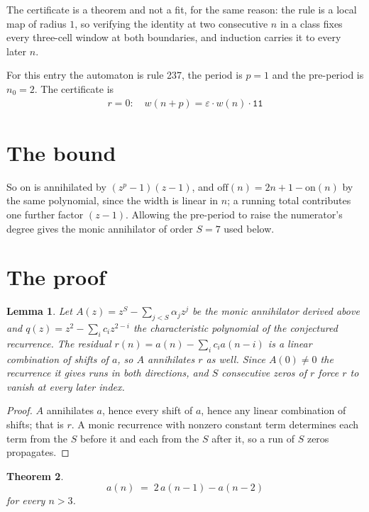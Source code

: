 \documentclass[11pt,a4paper]{article}
\theoremstyle{plain}
\newtheorem{theorem}{Theorem}
\newtheorem{lemma}[theorem]{Lemma}
\theoremstyle{definition}
\begin{document}
The certificate is a theorem and not a fit, for the same reason: the rule is a local map of
radius $1$, so verifying the identity at two consecutive $n$ in a class fixes every three-cell
window at both boundaries, and induction carries it to every later $n$.

For this entry the automaton is rule 237, the period is $p=1$ and the pre-period is $n_0=2$.
The certificate is
\begin{gather*}
r=0:\quad w(n+p) = \varepsilon \cdot w(n) \cdot \texttt{11}
\end{gather*}

\section{The bound}

So
$\mathrm{on}$ is annihilated by $(z^p-1)(z-1)$, and $\mathrm{off}(n)=2n+1-\mathrm{on}(n)$ by
the same polynomial, since the width is linear in $n$; a running total contributes one further
factor $(z-1)$. Allowing the pre-period to raise the numerator's degree gives the monic
annihilator of order $S=7$ used below.

\section{The proof}

\begin{lemma}\label{lem:crit}
Let $A(z)=z^S-\sum_{j<S}\alpha_jz^{j}$ be the monic annihilator derived above and
$q(z)=z^{2}-\sum_ic_iz^{2-i}$ the characteristic polynomial of the conjectured
recurrence. The residual $r(n)=a(n)-\sum_ic_ia(n-i)$ is a linear combination of shifts of $a$,
so $A$ annihilates $r$ as well. Since $A(0)\ne0$ the recurrence it gives runs in both
directions, and $S$ consecutive zeros of $r$ force $r$ to vanish at every later index.
\end{lemma}

\begin{proof}
$A$ annihilates $a$, hence every shift of $a$, hence any linear combination of shifts; that is
$r$. A monic recurrence with nonzero constant term determines each term from the $S$ before it
and each from the $S$ after it, so a run of $S$ zeros propagates.
\end{proof}

\begin{theorem}
\[
a(n)\;=\;2\,a(n-1) - a(n-2)
\]
for every $n>3$.
\end{theorem}
\end{document}
